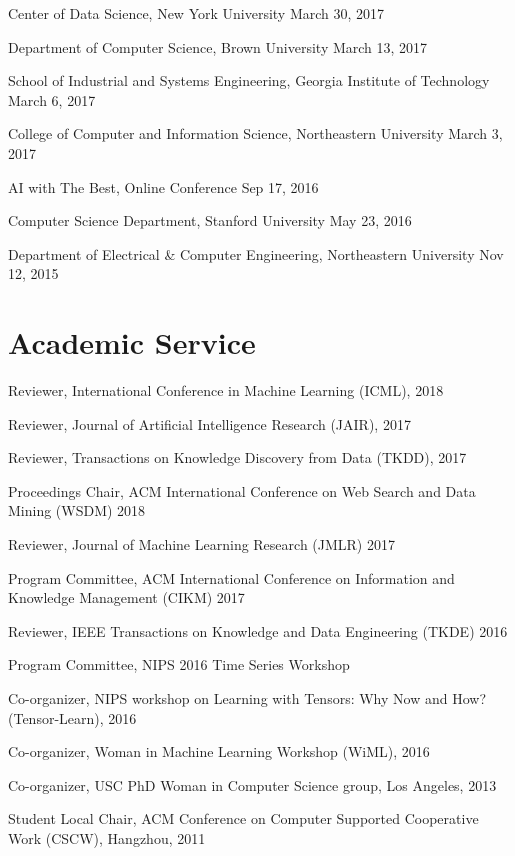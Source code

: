 \documentclass[margin,line]{res}
\begin{document}
\begin{resume}
Center of Data Science, New York University  \hfill {March 30, 2017}


Department of Computer Science, Brown University   \hfill {March 13, 2017}



School of Industrial and Systems Engineering, Georgia Institute of Technology  \hfill {March 6, 2017}


College of Computer and Information Science, Northeastern University  \hfill {March 3, 2017}


 
 AI with The Best, Online Conference \hfill {Sep 17, 2016}
 
 
Computer Science Department,  Stanford University  \hfill {May 23, 2016}
 
 
Department of  Electrical \& Computer Engineering,  Northeastern University  \hfill {Nov 12, 2015}



\section{\sc Academic Service}
Reviewer,  International Conference in Machine Learning (ICML), 2018


Reviewer,  Journal of Artificial Intelligence Research (JAIR), 2017


Reviewer,  Transactions on Knowledge Discovery from Data (TKDD), 2017


Proceedings Chair,  ACM International Conference on Web Search and Data Mining (WSDM) 2018

Reviewer,  Journal of Machine Learning Research (JMLR) 2017

Program Committee, ACM International Conference on Information and Knowledge Management (CIKM)  2017

Reviewer, IEEE Transactions on Knowledge and Data Engineering (TKDE) 2016

Program Committee, NIPS 2016 Time Series Workshop

Co-organizer, NIPS workshop on Learning with Tensors: Why Now and How? (Tensor-Learn), 2016


Co-organizer, Woman in Machine Learning Workshop (WiML), 2016

Co-organizer, USC PhD Woman in Computer Science group, Los Angeles, 2013

Student Local Chair, ACM Conference on Computer Supported Cooperative Work (CSCW), Hangzhou, 2011


\end{resume}
\end{document}
